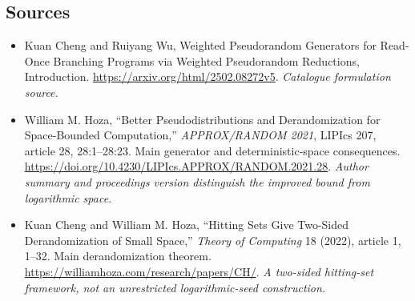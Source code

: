 \documentclass[11pt,a4paper]{article}
\numberwithin{equation}{section}
\begin{document}
\subsection{Sources}
\begin{itemize}\raggedright
\item[\textnormal{[S1]}]\hypertarget{source:163:1}{} Kuan Cheng and Ruiyang Wu, Weighted Pseudorandom Generators for Read-Once Branching Programs via Weighted Pseudorandom Reductions, Introduction.
\url{https://arxiv.org/html/2502.08272v5}.
{\small\textit{Catalogue formulation source.}}
\item[\textnormal{[E1]}]\hypertarget{extra:163:1}{} William M. Hoza, ``Better Pseudodistributions and Derandomization for Space-Bounded Computation,'' \emph{APPROX/RANDOM 2021}, LIPIcs 207, article 28, 28:1--28:23. Main generator and deterministic-space consequences.
\url{https://doi.org/10.4230/LIPIcs.APPROX/RANDOM.2021.28}.
{\small\textit{Author summary and proceedings version distinguish the improved bound from logarithmic space.}}
\item[\textnormal{[E2]}]\hypertarget{extra:163:2}{} Kuan Cheng and William M. Hoza, ``Hitting Sets Give Two-Sided Derandomization of Small Space,'' \emph{Theory of Computing} 18 (2022), article 1, 1--32. Main derandomization theorem.
\url{https://williamhoza.com/research/papers/CH/}.
{\small\textit{A two-sided hitting-set framework, not an unrestricted logarithmic-seed construction.}}
\end{itemize}
\end{document}
